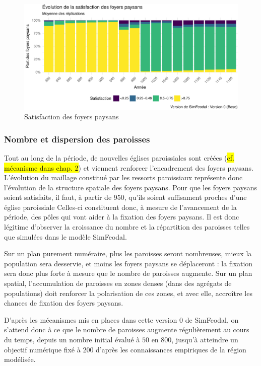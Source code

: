 \begin{figure}[H]
\captionsetup{width=\linewidth}
\includegraphics[width=0.95\linewidth]{img/resultats/v0_satisfaction_fp.pdf}
\caption{Satisfaction des foyers paysans} 
\label{fig:satisfaction-fp-v0} 
\end{figure}

\clearpage

\subsubsection{Nombre et dispersion des paroisses}

Tout au long de la période, de nouvelles églises paroissiales sont créées (\hl{cf. mécanisme dans chap. 2}) et viennent renforcer l'encadrement des foyers paysans.
L'évolution du maillage constitué par les ressorts paroissiaux représente donc l'évolution de la structure spatiale des foyers paysans.
Pour que les foyers paysans soient satisfaits, il faut, à partir de 950, qu'ils soient suffisament proches d'une église paroissiale
Celles-ci constituent donc, à mesure de l'avancement de la période, des pôles qui vont aider à la fixation des foyers paysans.
Il est donc légitime d'observer la croissance du nombre et la répartition des paroisses telles que simulées dans le modèle SimFeodal.

Sur un plan purement numéraire, plus les paroisses seront nombreuses, mieux la population sera desservie, et moins les foyers paysans se déplaceront : la fixation sera donc plus forte à mesure que le nombre de paroisses augmente.
Sur un plan spatial, l'accumulation de paroisses en zones denses (dans des agrégats de populations) doit renforcer la polarisation de ces zones, et avec elle, accroître les chances de fixation des foyers paysans.

D'après les mécanismes mis en places dans cette version 0 de SimFeodal, on s'attend donc à ce que le nombre de paroisses augmente régulièrement au cours du temps, depuis un nombre initial évalué à $50$ en $800$, jusqu'à atteindre un objectif numérique fixé à $200$ d'après les connaissances empiriques de la région modélisée.


